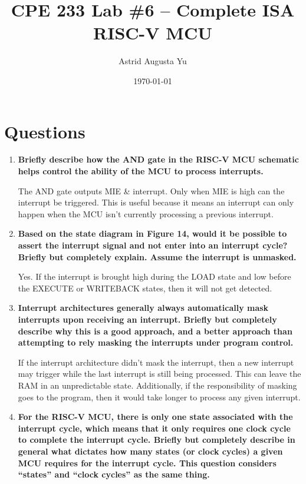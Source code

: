\documentclass{article}
\author{Astrid Augusta Yu}
\title{CPE 233 Lab \#6 -- Complete ISA RISC-V MCU}
\date{\today}
\begin{document}
\maketitle

\tableofcontents

\section{Questions}

\begin{enumerate}    
    \item \textbf{Briefly describe how the AND gate in the RISC-V MCU schematic helps control the ability of the MCU to process interrupts.}

    The AND gate outputs MIE \& interrupt. Only when MIE is high can the interrupt be triggered. This is useful because it means an interrupt can only happen when the MCU isn't currently processing a previous interrupt. 

    \item \textbf{Based on the state diagram in Figure 14, would it be possible to assert the interrupt signal and not enter into an interrupt cycle? Briefly but completely explain. Assume the interrupt is unmasked.}

    Yes. If the interrupt is brought high during the LOAD state and low before the EXECUTE or WRITEBACK states, then it will not get detected. 
    
    \item \textbf{Interrupt architectures generally always automatically mask interrupts upon receiving an interrupt. Briefly but completely describe why this is a good approach, and a better approach than attempting to rely masking the interrupts under program control.}
    
    If the interrupt architecture didn't mask the interrupt, then a new interrupt may trigger while the last interrupt is still being processed. This can leave the RAM in an unpredictable state. Additionally, if the responsibility of masking goes to the program, then it would take longer to process any given interrupt. 
    
    \item \textbf{For the RISC-V MCU, there is only one state associated with the interrupt cycle, which means that it only requires one clock cycle to complete the interrupt cycle. Briefly but completely describe in general what dictates how many states (or clock cycles) a given MCU requires for the interrupt cycle. This question considers “states” and “clock cycles” as the same thing.}


\end{enumerate}
\end{document}
